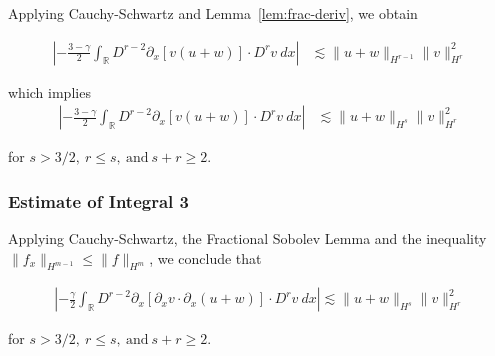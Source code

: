 \documentclass[handout]{beamer}
\numberwithin{equation}{section}
\newcommand{\rr}{\mathbb{R}}
\newcommand{\p}{\partial}
\begin{document}
\begin{frame}


Applying Cauchy-Schwartz and Lemma~\ref{lem:frac-deriv}, we obtain



\begin{equation*}
\begin{split}
\left | - \frac{3-\gamma}{2} \int_{\rr}  D^{r -2}
\p_x[v(u+w)] \cdot
D^r v \ dx  \right |
 & \lesssim \|u+w\|_{H^{r -1}} \|v\|_{H^r}^2
\end{split}
\end{equation*}


which implies
\begin{equation*}
\begin{split}
\left | - \frac{3-\gamma}{2} \int_{\rr}  D^{r -2}
\p_x[v(u+w)] \cdot
D^r v \ dx  \right |
 & \lesssim \|u+w\|_{H^{s}} \|v\|_{H^r}^2
 \label{3v}
\end{split}
\end{equation*}

for $s > 3/2, \ r \le s, \ \text{and} \ s + r \ge 2$.

\end{frame}
\begin{frame}
\frametitle{Estimate of Integral 3} 

Applying Cauchy-Schwartz, the Fractional Sobolev Lemma and the inequality $\| f_{x}
\|_{H^{m-1}} \le \| f \|_{H^{m}}$,  we conclude that

\begin{equation*}
\begin{split}
\left | - \frac{\gamma}{2} \int_{\rr} D^{r 
-2} \p_x [ \p_x v
\cdot \p_x (u+w)]\cdot D^r v \ dx \right | 
 \lesssim \|u+w \|_{H^{s}}
\|v\|_{H^r}^2
\label{3'v}
\end{split}
\end{equation*}


for $s > 3/2, \ r \le s, \ \text{and} \ s + r \ge 2$.
\end{frame}
\end{document}

